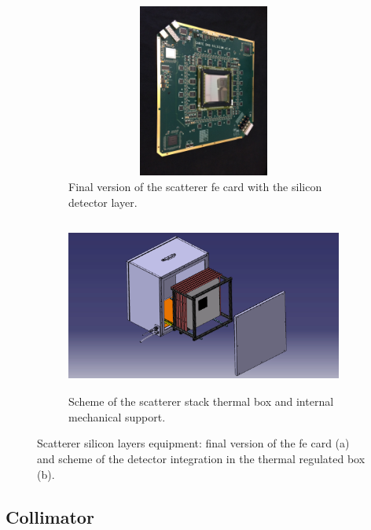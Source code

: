 \begin{figure}
\begin{subfigure}[t]{.5\textwidth}
\centering
\includegraphics[width=1\textwidth, height = 5.7cm]{03_GraphicFiles/chapter3_CLaRySproto/Scatterer/DAQ_card.JPG}
\caption{Final version of the scatterer \gls{fe} card with the silicon detector layer.}
\label{chap3::fig::scattDAQcard}
\end{subfigure}
\begin{subfigure}[t]{.5\textwidth}
\centering
\includegraphics[width=1\textwidth, trim={5cm 0 5cm 0}, clip = true, height = 5.7cm]{03_GraphicFiles/chapter3_CLaRySproto/Scatterer/Rack_cartes_Si_2.jpg}
\caption{Scheme of the scatterer stack thermal box and internal mechanical support.}
\label{chap3::fig::thermalBox}
\end{subfigure}
\caption{Scatterer silicon layers equipment: final version of the \gls{fe} card (a) and scheme of the detector integration in the thermal regulated box (b).}
\label{chap3::fig::scattererCardMech}
\end{figure} 


\subsection{Collimator}\label{chap3::subsec::collimator}
 
